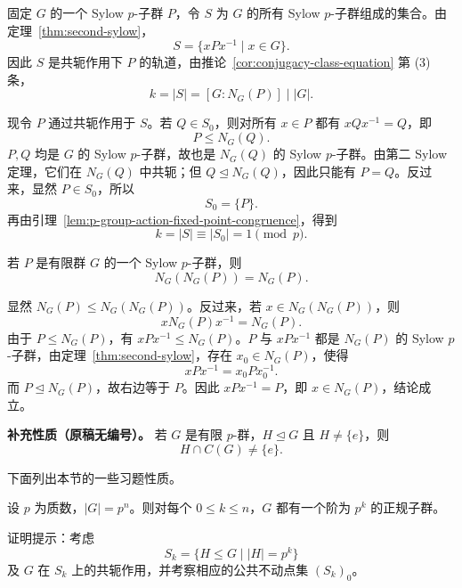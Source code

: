 \begin{purpleproof}
固定 $G$ 的一个 Sylow $p$-子群 $P$，令 $S$ 为 $G$ 的所有 Sylow $p$-子群组成的集合。由定理~\ref{thm:second-sylow}，
\[
  S=\{xPx^{-1}\mid x\in G\}.
\]
因此 $S$ 是共轭作用下 $P$ 的轨道，由推论~\ref{cor:conjugacy-class-equation} 第 (3) 条，
\[
  k=|S|=[G:N_G(P)]\mid |G|.
\]

现令 $P$ 通过共轭作用于 $S$。若 $Q\in S_0$，则对所有 $x\in P$ 都有 $xQx^{-1}=Q$，即
\[
  P\leq N_G(Q).
\]
$P,Q$ 均是 $G$ 的 Sylow $p$-子群，故也是 $N_G(Q)$ 的 Sylow $p$-子群。由第二 Sylow 定理，它们在 $N_G(Q)$ 中共轭；但 $Q\trianglelefteq N_G(Q)$，因此只能有 $P=Q$。反过来，显然 $P\in S_0$，所以
\[
  S_0=\{P\}.
\]
再由引理~\ref{lem:p-group-action-fixed-point-congruence}，得到
\[
  k=|S|\equiv|S_0|=1\pmod p.
\]
\end{purpleproof}

\begin{theorem}\label{thm:sylow-normalizer-self-normalizing}
若 $P$ 是有限群 $G$ 的一个 Sylow $p$-子群，则
\[
  N_G(N_G(P))=N_G(P).
\]
\end{theorem}

\begin{purpleproof}
显然 $N_G(P)\leq N_G(N_G(P))$。反过来，若 $x\in N_G(N_G(P))$，则
\[
  xN_G(P)x^{-1}=N_G(P).
\]
由于 $P\leq N_G(P)$，有 $xPx^{-1}\leq N_G(P)$。$P$ 与 $xPx^{-1}$ 都是 $N_G(P)$ 的 Sylow $p$-子群，由定理~\ref{thm:second-sylow}，存在 $x_0\in N_G(P)$，使得
\[
  xPx^{-1}=x_0Px_0^{-1}.
\]
而 $P\trianglelefteq N_G(P)$，故右边等于 $P$。因此 $xPx^{-1}=P$，即 $x\in N_G(P)$，结论成立。
\end{purpleproof}

\par\textbf{补充性质（原稿无编号）。}
若 $G$ 是有限 $p$-群，$H\trianglelefteq G$ 且 $H\ne\{e\}$，则
\[
  H\cap C(G)\ne\{e\}.
\]

下面列出本节的一些习题性质。

\begin{proposition}\label{prop:p-group-normal-subgroups-all-orders}
设 $p$ 为质数，$|G|=p^n$。则对每个 $0\leq k\leq n$，$G$ 都有一个阶为 $p^k$ 的正规子群。
\end{proposition}

\begin{purplenote}
证明提示：考虑
\[
  S_k=\{H\leq G\mid |H|=p^k\}
\]
及 $G$ 在 $S_k$ 上的共轭作用，并考察相应的公共不动点集 $(S_k)_0$。
\end{purplenote}

